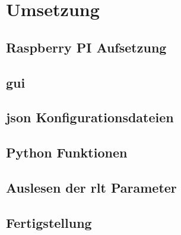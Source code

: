 \chapter{Umsetzung}

\section{Raspberry PI Aufsetzung}
\setAuthor{\pezze}


\setAuthor{\mangeng}


\section{\acf{gui}}\label{gui_design}
\setAuthor{\pezze}



\section{\acs{json} Konfigurationsdateien}
\setAuthor{\pezze}



\setAuthor{\schneider}


\section{Python Funktionen}
\setAuthor{\pezze}


\section{Auslesen der \acs{rlt} Parameter}
\setAuthor{\schneider}


\section{Fertigstellung}
\setAuthor{\schneider}


\setAuthor{\pezze}


